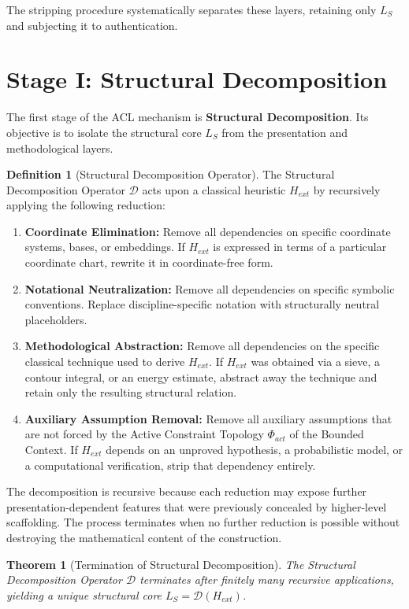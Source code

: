 \documentclass[12pt,openany]{extbook}
\theoremstyle{plain}
\newtheorem{theorem}{Theorem}[chapter]
\theoremstyle{definition}
\newtheorem{definition}{Definition}[chapter]
\begin{document}
The stripping procedure systematically separates these layers, retaining only $L_S$ and subjecting it to authentication.

\section{Stage I: Structural Decomposition}

The first stage of the ACL mechanism is \textbf{Structural Decomposition}. Its objective is to isolate the structural core $L_S$ from the presentation and methodological layers.

\begin{definition}[Structural Decomposition Operator]
The Structural Decomposition Operator $\mathcal{D}$ acts upon a classical heuristic $H_{ext}$ by recursively applying the following reduction:
\begin{enumerate}
    \item \textbf{Coordinate Elimination:} Remove all dependencies on specific coordinate systems, bases, or embeddings. If $H_{ext}$ is expressed in terms of a particular coordinate chart, rewrite it in coordinate-free form.
    \item \textbf{Notational Neutralization:} Remove all dependencies on specific symbolic conventions. Replace discipline-specific notation with structurally neutral placeholders.
    \item \textbf{Methodological Abstraction:} Remove all dependencies on the specific classical technique used to derive $H_{ext}$. If $H_{ext}$ was obtained via a sieve, a contour integral, or an energy estimate, abstract away the technique and retain only the resulting structural relation.
    \item \textbf{Auxiliary Assumption Removal:} Remove all auxiliary assumptions that are not forced by the Active Constraint Topology $\Phi_{act}$ of the Bounded Context. If $H_{ext}$ depends on an unproved hypothesis, a probabilistic model, or a computational verification, strip that dependency entirely.
\end{enumerate}
\end{definition}

The decomposition is recursive because each reduction may expose further presentation-dependent features that were previously concealed by higher-level scaffolding. The process terminates when no further reduction is possible without destroying the mathematical content of the construction.

\begin{theorem}[Termination of Structural Decomposition]
The Structural Decomposition Operator $\mathcal{D}$ terminates after finitely many recursive applications, yielding a unique structural core $L_S = \mathcal{D}(H_{ext})$.
\end{theorem}
\end{document}
